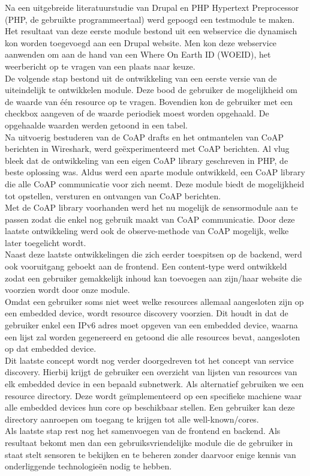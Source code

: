 Na een uitgebreide literatuurstudie van Drupal en PHP Hypertext Preprocessor (PHP, de gebruikte programmeertaal) werd gepoogd een testmodule te maken. Het resultaat van deze eerste module bestond uit een webservice die dynamisch kon worden toegevoegd aan een Drupal website. Men kon deze webservice aanwenden om aan de hand van een Where On Earth ID (WOEID), het weerbericht op te vragen van een plaats naar keuze.\\
De volgende stap bestond uit de ontwikkeling van een eerste versie van de uiteindelijk te ontwikkelen module. Deze bood de gebruiker de mogelijkheid om de waarde van \'{e}\'{e}n resource op te vragen. Bovendien kon de gebruiker met een checkbox aangeven of de waarde periodiek moest worden opgehaald. De opgehaalde waarden werden getoond in een tabel.\\
Na uitvoerig bestuderen van de CoAP drafts en het ontmantelen van CoAP berichten in Wireshark, werd ge\"{e}xperimenteerd met CoAP berichten. Al vlug bleek dat de ontwikkeling van een eigen CoAP library geschreven in PHP, de beste oplossing was. Aldus werd een aparte module ontwikkeld, een CoAP library die alle CoAP communicatie voor zich neemt. Deze module biedt de mogelijkheid tot opstellen, versturen en ontvangen van CoAP berichten.\\
Met de CoAP library voorhanden werd het nu mogelijk de sensormodule aan te passen zodat die enkel nog gebruik maakt van CoAP communicatie. Door deze laatste ontwikkeling werd ook de observe-methode van CoAP mogelijk, welke later toegelicht wordt.\\
Naast deze laatste ontwikkelingen die zich eerder toespitsen op de backend, werd ook vooruitgang geboekt aan de frontend. Een content-type werd ontwikkeld zodat een gebruiker gemakkelijk inhoud kan toevoegen aan zijn/haar website die voorzien wordt door onze module.\\
Omdat een gebruiker soms niet weet welke resources allemaal aangesloten zijn op een embedded device, wordt resource discovery voorzien. Dit houdt in dat de gebruiker enkel een IPv6 adres moet opgeven van een embedded device, waarna een lijst zal worden gegenereerd en getoond die alle resources bevat, aangesloten op dat embedded device.\\
Dit laatste concept wordt nog verder doorgedreven tot het concept van service discovery. Hierbij krijgt de gebruiker een overzicht van lijsten van resources van elk embedded device in een bepaald subnetwerk. Als alternatief gebruiken we een resource directory. Deze wordt ge\"{i}mplementeerd op een specifieke machiene waar alle embedded devices hun core op beschikbaar stellen. Een gebruiker kan deze directory aanroepen om toegang te krijgen tot alle well-known/cores.\\
Als laatste stap rest nog het samenvoegen van de frontend en backend. Als resultaat bekomt men dan een gebruiksvriendelijke module die de gebruiker in staat stelt sensoren te bekijken en te beheren zonder daarvoor enige kennis van onderliggende technologie\"{e}n nodig te hebben.


